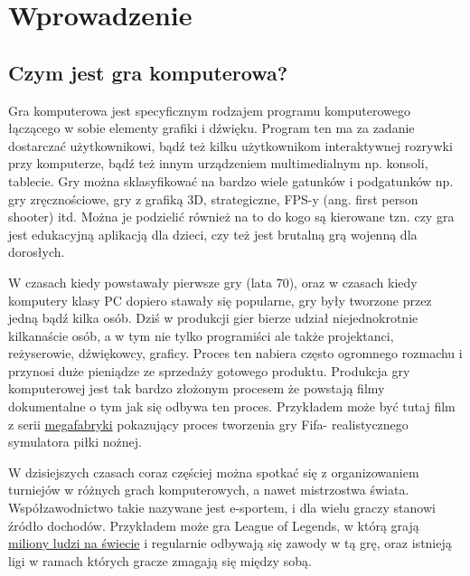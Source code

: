 \setcounter{secnumdepth}{3}
\renewcommand{\chaptername}{Rozdział}
\chapter{Wprowadzenie} 

\section{Czym jest gra komputerowa?}
\hspace{1cm} Gra komputerowa jest specyficznym rodzajem programu komputerowego łączącego w sobie elementy grafiki i dźwięku. Program ten ma za zadanie dostarczać użytkownikowi, bądź też kilku użytkownikom interaktywnej rozrywki przy komputerze, bądź też innym urządzeniem multimedialnym np. konsoli, tablecie. Gry można sklasyfikować na bardzo wiele gatunków i podgatunków np. gry zręcznościowe, gry z grafiką 3D, strategiczne, FPS-y (ang. first person shooter) itd. Można je podzielić również na to do kogo są kierowane tzn. czy gra jest edukacyjną aplikacją dla dzieci, czy też jest brutalną grą wojenną dla dorosłych.

W czasach kiedy powstawały pierwsze gry (lata 70), oraz w czasach kiedy komputery klasy PC dopiero stawały się popularne, gry były tworzone przez jedną bądź kilka osób. Dziś w produkcji gier bierze udział niejednokrotnie kilkanaście osób, a w tym nie tylko programiści ale także projektanci, reżyserowie, dźwiękowcy, graficy. 
Proces ten nabiera często ogromnego rozmachu i przynosi duże pieniądze ze sprzedaży gotowego produktu. Produkcja gry komputerowej jest tak bardzo złożonym procesem że powstają filmy dokumentalne o tym jak się odbywa ten proces. Przykładem może być tutaj film z serii \href{http://natgeotv.com/uk/megafactories/videos/ea-sports}{megafabryki} pokazujący proces tworzenia gry Fifa- realistycznego symulatora piłki nożnej. 

W dzisiejszych czasach coraz częściej można spotkać się z organizowaniem turniejów w różnych grach komputerowych, a nawet mistrzostwa świata. Współzawodnictwo takie nazywane jest e-sportem, i dla wielu graczy stanowi źródło dochodów. Przykładem może gra League of Legends, w którą grają  \href{http://gamezilla.komputerswiat.pl/newsy/2012/41/league-of-legends-w-liczbach-przerazajaco-wysokich-liczbach}{miliony ludzi na świecie} i regularnie odbywają się zawody w tą grę, oraz istnieją ligi w ramach których gracze zmagają się między sobą.

